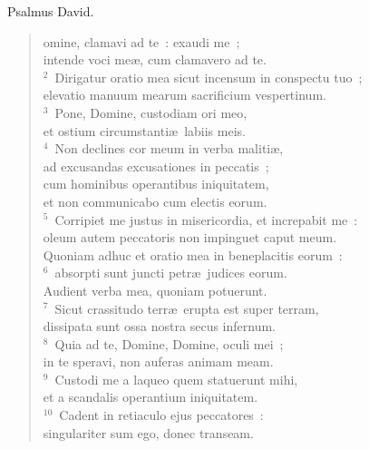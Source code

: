 \bchapter[Psalm]
Psalmus David. \begin{verse}omine, clamavi ad te~: exaudi me~;\\ intende voci me\ae , cum clamavero ad te.\\
${}^{2}$~Dirigatur oratio mea sicut incensum in conspectu tuo~;\\ elevatio manuum mearum sacrificium vespertinum.\\
${}^{3}$~Pone, Domine, custodiam ori meo,\\ et ostium circumstanti\ae\ labiis meis.\\
${}^{4}$~Non declines cor meum in verba maliti\ae ,\\ ad excusandas excusationes in peccatis~;\\ cum hominibus operantibus iniquitatem,\\ et non communicabo cum electis eorum.\\
${}^{5}$~Corripiet me justus in misericordia, et increpabit me~:\\ oleum autem peccatoris non impinguet caput meum.\\ Quoniam adhuc et oratio mea in beneplacitis eorum~:\\
${}^{6}$~absorpti sunt juncti petr\ae\ judices eorum.\\ Audient verba mea, quoniam potuerunt.\\
${}^{7}$~Sicut crassitudo terr\ae\ erupta est super terram,\\ dissipata sunt ossa nostra secus infernum.\\
${}^{8}$~Quia ad te, Domine, Domine, oculi mei~;\\ in te speravi, non auferas animam meam.\\
${}^{9}$~Custodi me a laqueo quem statuerunt mihi,\\ et a scandalis operantium iniquitatem.\\
${}^{10}$~Cadent in retiaculo ejus peccatores~:\\ singulariter sum ego, donec transeam.\end{verse}



